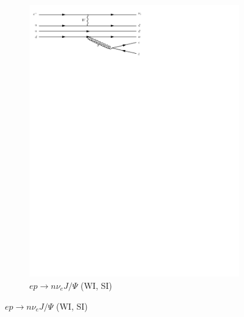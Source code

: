 \begin{figure}[h]
\begin{subfigure}[b]{0.3\textwidth}
    \includegraphics[trim={0.5cm 22cm 10cm 0cm},width=\textwidth]{../Diagrams/D18.pdf}
    \caption{$ep\rightarrow n\nu_eJ/\Psi$ (WI, SI)}
    \label{fey:18}
  \end{subfigure}%
\end{figure}

